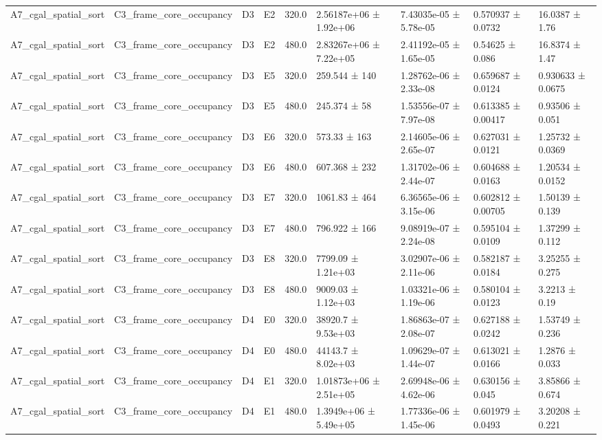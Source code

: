 \begin{table}
\begin{tabular}{lllllllll}
A7\_cgal\_spatial\_sort & C3\_frame\_core\_occupancy & D3 & E2 & 320.0 & 2.56187e+06 ± 1.92e+06 & 7.43035e-05 ± 5.78e-05 & 0.570937 ± 0.0732 & 16.0387 ± 1.76 \\
A7\_cgal\_spatial\_sort & C3\_frame\_core\_occupancy & D3 & E2 & 480.0 & 2.83267e+06 ± 7.22e+05 & 2.41192e-05 ± 1.65e-05 & 0.54625 ± 0.086 & 16.8374 ± 1.47 \\
A7\_cgal\_spatial\_sort & C3\_frame\_core\_occupancy & D3 & E5 & 320.0 & 259.544 ± 140 & 1.28762e-06 ± 2.33e-08 & 0.659687 ± 0.0124 & 0.930633 ± 0.0675 \\
A7\_cgal\_spatial\_sort & C3\_frame\_core\_occupancy & D3 & E5 & 480.0 & 245.374 ± 58 & 1.53556e-07 ± 7.97e-08 & 0.613385 ± 0.00417 & 0.93506 ± 0.051 \\
A7\_cgal\_spatial\_sort & C3\_frame\_core\_occupancy & D3 & E6 & 320.0 & 573.33 ± 163 & 2.14605e-06 ± 2.65e-07 & 0.627031 ± 0.0121 & 1.25732 ± 0.0369 \\
A7\_cgal\_spatial\_sort & C3\_frame\_core\_occupancy & D3 & E6 & 480.0 & 607.368 ± 232 & 1.31702e-06 ± 2.44e-07 & 0.604688 ± 0.0163 & 1.20534 ± 0.0152 \\
A7\_cgal\_spatial\_sort & C3\_frame\_core\_occupancy & D3 & E7 & 320.0 & 1061.83 ± 464 & 6.36565e-06 ± 3.15e-06 & 0.602812 ± 0.00705 & 1.50139 ± 0.139 \\
A7\_cgal\_spatial\_sort & C3\_frame\_core\_occupancy & D3 & E7 & 480.0 & 796.922 ± 166 & 9.08919e-07 ± 2.24e-08 & 0.595104 ± 0.0109 & 1.37299 ± 0.112 \\
A7\_cgal\_spatial\_sort & C3\_frame\_core\_occupancy & D3 & E8 & 320.0 & 7799.09 ± 1.21e+03 & 3.02907e-06 ± 2.11e-06 & 0.582187 ± 0.0184 & 3.25255 ± 0.275 \\
A7\_cgal\_spatial\_sort & C3\_frame\_core\_occupancy & D3 & E8 & 480.0 & 9009.03 ± 1.12e+03 & 1.03321e-06 ± 1.19e-06 & 0.580104 ± 0.0123 & 3.2213 ± 0.19 \\
A7\_cgal\_spatial\_sort & C3\_frame\_core\_occupancy & D4 & E0 & 320.0 & 38920.7 ± 9.53e+03 & 1.86863e-07 ± 2.08e-07 & 0.627188 ± 0.0242 & 1.53749 ± 0.236 \\
A7\_cgal\_spatial\_sort & C3\_frame\_core\_occupancy & D4 & E0 & 480.0 & 44143.7 ± 8.02e+03 & 1.09629e-07 ± 1.44e-07 & 0.613021 ± 0.0166 & 1.2876 ± 0.033 \\
A7\_cgal\_spatial\_sort & C3\_frame\_core\_occupancy & D4 & E1 & 320.0 & 1.01873e+06 ± 2.51e+05 & 2.69948e-06 ± 4.62e-06 & 0.630156 ± 0.045 & 3.85866 ± 0.674 \\
A7\_cgal\_spatial\_sort & C3\_frame\_core\_occupancy & D4 & E1 & 480.0 & 1.3949e+06 ± 5.49e+05 & 1.77336e-06 ± 1.45e-06 & 0.601979 ± 0.0493 & 3.20208 ± 0.221 \\

\end{tabular}
\end{table}
